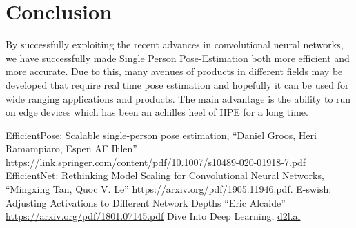 \documentclass{fisatprojectfinal}
\begin{document}
\chapter{Conclusion}

By successfully exploiting the recent advances in convolutional neural networks, we have successfully made Single Person Pose-Estimation both more efficient and more accurate.
Due to this, many avenues of products in different fields may be developed that require real time pose estimation and hopefully it can be
used for wide ranging applications and products. The main advantage is the ability to run on edge devices which has been an achilles heel of
HPE for a long time.

\begin{thebibliography}{1}
 EfficientPose: Scalable single-person pose estimation, ``Daniel Groos, Heri Ramampiaro, Espen AF Ihlen'' \url{https://link.springer.com/content/pdf/10.1007/s10489-020-01918-7.pdf}
 EfficientNet: Rethinking Model Scaling for Convolutional Neural Networks, ``Mingxing Tan, Quoc V. Le'' \url{https://arxiv.org/pdf/1905.11946.pdf}.
 E-swish: Adjusting Activations to Different Network Depths ``Eric Alcaide'' \url{https://arxiv.org/pdf/1801.07145.pdf}
 Dive Into Deep Learning, \url{d2l.ai}
\end{thebibliography}
\end{document}
